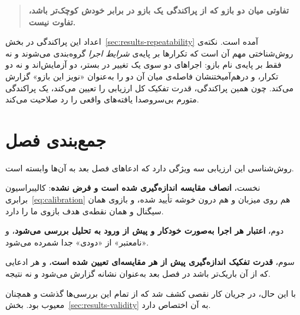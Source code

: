 \begin{quote}
\textbf{تفاوتی میان دو بازو که از پراکندگی یک بازو در برابر خودش کوچک‌تر باشد، تفاوت نیست.}
\end{quote}

اعداد این پراکندگی در بخش~\ref{sec:results-repeatability} آمده است. نکته‌ی روش‌شناختی مهم آن
است که تکرارها بر پایه‌ی \emph{شرایط اجرا} گروه‌بندی می‌شوند و نه فقط بر پایه‌ی نام بازو:
اجراهای دو سوی یک تغییر در بستر، دو آزمایش‌اند و نه دو تکرار، و درهم‌آمیختنشان فاصله‌ی میان
آن دو را به‌عنوان «نویز این بازو» گزارش می‌کند. چون همین پراکندگی، قدرت تفکیک کل ارزیابی را
تعیین می‌کند، یک پراکندگی متورم بی‌سروصدا یافته‌های واقعی را رد صلاحیت می‌کند.

\section{جمع‌بندی فصل}
\label{sec:method-summary}

روش‌شناسی این ارزیابی سه ویژگی دارد که ادعاهای فصل بعد به آن‌ها وابسته است.

نخست، \textbf{انصاف مقایسه اندازه‌گیری شده است و فرض نشده}: کالیبراسیون
برابری~\ref{eq:calibration} هم روی میزبان و هم درون خوشه تأیید شده، و بازوی 
همان سیگنال و همان نقطه‌ی هدف بازوی ما را دارد.

دوم، \textbf{اعتبار هر اجرا به‌صورت خودکار و پیش از ورود به تحلیل بررسی می‌شود}، و
«نامعتبر» از «دودی» جدا شمرده می‌شود.

سوم، \textbf{قدرت تفکیک اندازه‌گیری پیش از هر مقایسه‌ای تعیین شده است}، و هر ادعایی که از آن
باریک‌تر باشد در فصل بعد به‌عنوان نشانه گزارش می‌شود و نه نتیجه.

با این حال، در جریان کار نقصی کشف شد که از تمام این بررسی‌ها گذشت و همچنان معیوب بود.
بخش~\ref{sec:results-validity} به آن اختصاص دارد.
